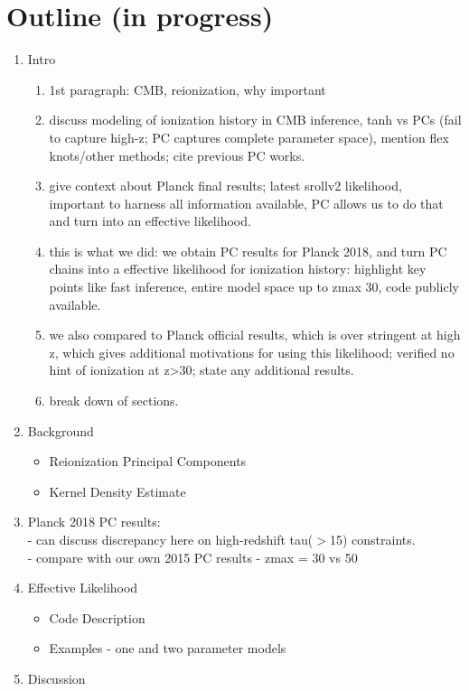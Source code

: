 \documentclass[prd,twocolumn,amsmath,amssymb,floatfix,superscriptaddress,nofootinbib]{revtex4-1}
\begin{document}


\appendix

\section{Outline (in progress)}

\begin{enumerate}
    \item{Intro}
        \begin{enumerate}
            \item 1st paragraph: CMB, reionization, why important
            \item discuss modeling of ionization history in CMB inference, tanh vs PCs (fail to capture high-z; PC captures complete parameter space), mention flex knots/other methods; cite previous PC works.
            \item give context about Planck final results; latest srollv2 likelihood, important to harness all information available, PC allows us to do that and turn into an effective likelihood.
            \item this is what we did: we obtain PC results for Planck 2018, and turn PC chains into a effective likelihood for ionization history: highlight key points like fast inference, entire model space up to zmax 30, code publicly available.
            \item we also compared to Planck official results, which is over stringent at high z, which gives additional motivations for using this likelihood; verified no hint of ionization at z>30; state any additional results.
            \item break down of sections.
        \end{enumerate}

	\item{Background}
		\begin{itemize}
			\item{Reionization Principal Components}	
			\item{Kernel Density Estimate}
		\end{itemize}
	\item{Planck 2018 PC results:\\
		- can discuss discrepancy here on high-redshift tau($>$15) constraints.\\
		- compare with our own 2015 PC results
		- zmax = 30 vs 50}
	\item{Effective Likelihood}
		\begin{itemize}
			\item{Code Description}
			\item{Examples - one and two parameter models}
		\end{itemize}
	\item{Discussion}
		
\end{enumerate}
\end{document}
